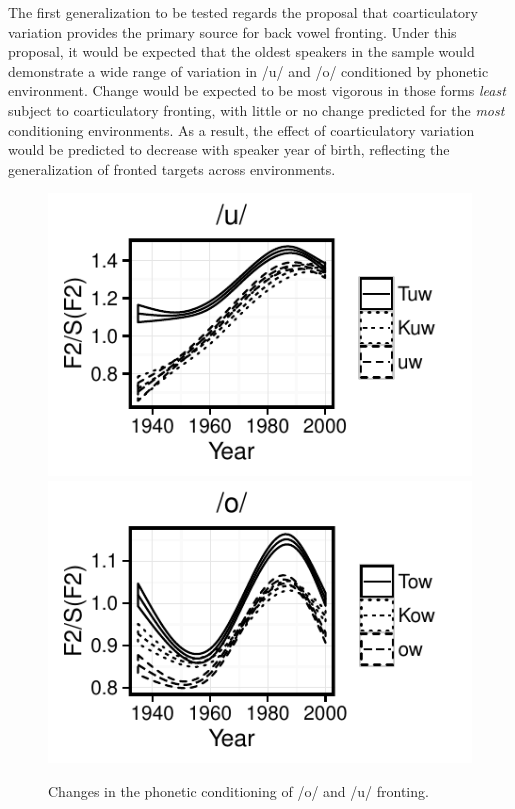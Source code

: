 \documentclass[12pt]{article}
\begin{document}
The first generalization to be tested regards the proposal that coarticulatory variation provides the primary source for back vowel fronting. Under this proposal, it would be expected that the oldest speakers in the sample would demonstrate a wide range of variation in /u/ and /o/ conditioned by phonetic environment. Change would be expected to be most vigorous in those forms \textit{least} subject to coarticulatory fronting, with little or no change predicted for the \textit{most} conditioning environments. As a result, the effect of coarticulatory variation would be predicted to decrease with speaker year of birth, reflecting the generalization of fronted targets across environments. 
\begin{figure}[!htbp]
\includegraphics{uwphoneticconditioning}
\includegraphics{owphoneticconditioning}
\caption{Changes in the phonetic conditioning of /o/ and /u/ fronting.}
\end{figure}
\end{document}
